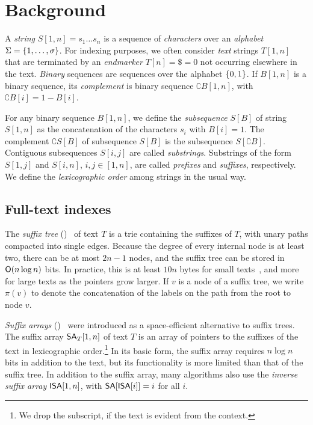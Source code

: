 \section{Background}

A \emph{string} $S[1,n] = s_{1} \dotso s_{n}$ is a sequence of
\emph{characters} over an \emph{alphabet} $\Sigma = \{ 1, \dotsc, \sigma \}$.
For indexing purposes, we often consider \emph{text} strings $T[1,n]$ that are
terminated by an \emph{endmarker} $T[n] = \$ = 0$ not occurring elsewhere in
the text. \emph{Binary} sequences are sequences over the alphabet $\{ 0,1 \}$.
If $B[1,n]$ is a binary sequence, its \emph{complement} is binary sequence
$\complement{B}[1,n]$, with $\complement{B}[i] = 1 - B[i]$.

For any binary sequence $B[1,n]$, we define the \emph{subsequence} $S[B]$ of
string $S[1,n]$ as the concatenation of the characters $s_{i}$ with $B[i] = 1$.
The complement $\complement{S}[B]$ of subsequence $S[B]$ is the subsequence
$S[\complement{B}]$. Contiguous subsequences $S[i,j]$ are called
\emph{substrings}. Substrings of the form $S[1,j]$ and $S[i,n]$, $i,j \in
[1,n]$, are called \emph{prefixes} and \emph{suffixes}, respectively. We
define the \emph{lexicographic order} among strings in the usual way.

\subsection{Full-text indexes}

The \emph{suffix tree} (\ST)~\cite{Weiner1973} of text $T$ is a trie
containing the suffixes of $T$, with unary paths compacted into single edges.
Because the degree of every internal node is at least two, there can be at most
$2n-1$ nodes, and the suffix tree can be stored in $\mathsf{O}(n \log n)$ bits. In
practice, this is at least $10n$ bytes for small texts~\cite{Kurtz1999}, and
more for large texts as the pointers grow larger. If $v$ is a node of a suffix
tree, we write $\pi(v)$ to denote the concatenation of the labels on the path
from the root to node $v$.

\emph{Suffix arrays} (\SA)~\cite{Manber1993} were introduced as a
space-efficient alternative to suffix trees. The suffix array $\mathsf{SA}_{T}[1,n]$ of
text $T$ is an array of pointers to the suffixes of the text in lexicographic
order.\footnote{We drop the subscript, if the text is evident from the context.}
In its basic form, the suffix array requires $n \log n$ bits in
addition to the text, but its functionality is more limited than that of the
suffix tree. In addition to the suffix array, many algorithms also use the
\emph{inverse suffix array} $\mathsf{ISA}[1,n]$, with $\mathsf{SA}[\mathsf{ISA}[i]] = i$ for all
$i$.

